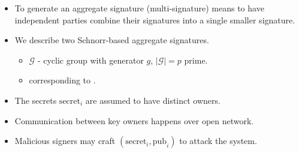 \begin{frame}
\begin{itemize}
\item To generate an aggregate signature (multi-signature) means to have independent parties combine their signatures into a single smaller signature.
\item<2-> We describe two Schnorr-based aggregate signatures. 
\begin{emptyTheorem}
\begin{itemize}
\item<3-> $\mathcal G$ - cyclic group with generator $g$, $\left|\mathcal G\right| = p$ prime.
\item<4->  corresponding to .
\end{itemize}
\end{emptyTheorem}
\item<5-> The secrets $\mathrm{secret}_i$ are assumed to have distinct owners. 
\item<6-> Communication between key owners happens over open network. 
\item<7-> Malicious signers may craft $\left(\mathrm{secret}_i, \mathrm{pub}_i\right)$ to attack the system.
\end{itemize}

\end{frame}